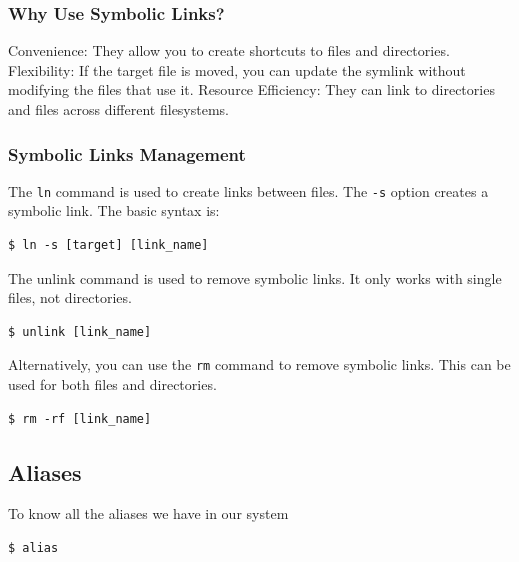 \documentclass{article}
\newenvironment{blocktemplateI}[1]{%
    \tcolorbox[beamer,%
    noparskip,breakable,
    colframe=Violet,%
    colbacklower=Black,%
    title=#1]}%
    {\endtcolorbox}
\newenvironment{codetemplate}[1][]{%
  \mybasecolorbox[#1]
  \itshape
}{%
  \endmybasecolorbox
}
\begin{document}
\subsubsection{Why Use Symbolic Links?}
Convenience: They allow you to create shortcuts to files and directories.
Flexibility: If the target file is moved, you can update the symlink without modifying the files that use it.
Resource Efficiency: They can link to directories and files across different filesystems.

\subsubsection{Symbolic Links Management}
The \verb|ln| command is used to create links between files. The \verb|-s| option creates a symbolic link. The basic syntax is:
\begin{codetemplate}{}
\begin{verbatim}
$ ln -s [target] [link_name]
\end{verbatim}
\end{codetemplate}

The unlink command is used to remove symbolic links. It only works with single files, not directories.
\begin{codetemplate}{}
\begin{verbatim}
$ unlink [link_name]
\end{verbatim}
\end{codetemplate}

\begin{blocktemplateI}{Note}
Alternatively, you can use the \verb|rm| command to remove symbolic links. This can be used for both files and directories.
\begin{codetemplate}{}
\begin{verbatim}
$ rm -rf [link_name]
\end{verbatim}
\end{codetemplate}
\end{blocktemplateI}

\subsection{Aliases}
To know all the aliases we have in our system
\begin{codetemplate}
\begin{verbatim}
$ alias
\end{verbatim}
\end{codetemplate}
\end{document}
